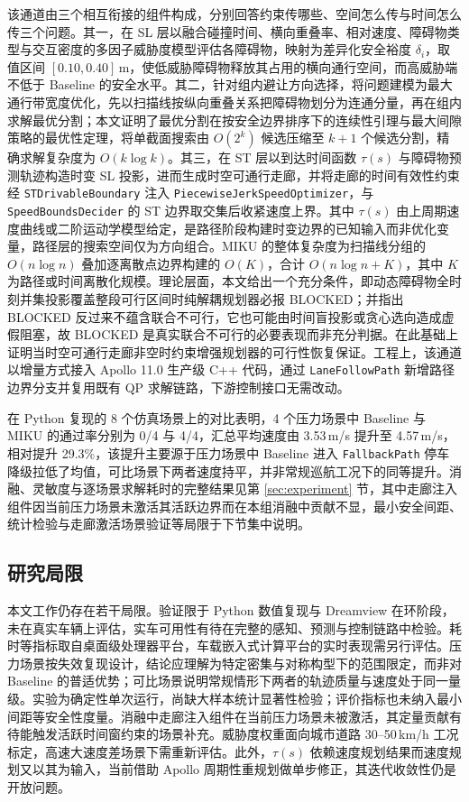 \documentclass[a4paper,11pt]{ctexart}
\theoremstyle{definition}
\begin{document}
该通道由三个相互衔接的组件构成，分别回答约束传哪些、空间怎么传与时间怎么传三个问题。其一，在 SL 层以融合碰撞时间、横向重叠率、相对速度、障碍物类型与交互密度的多因子威胁度模型评估各障碍物，映射为差异化安全裕度 $\delta_i$，取值区间 $[0.10, 0.40]$\,m，使低威胁障碍物释放其占用的横向通行空间，而高威胁端不低于 Baseline 的安全水平。其二，针对组内避让方向选择，将问题建模为最大通行带宽度优化，先以扫描线按纵向重叠关系把障碍物划分为连通分量，再在组内求解最优分割；本文证明了最优分割在按安全边界排序下的连续性引理与最大间隙策略的最优性定理，将单截面搜索由 $O(2^k)$ 候选压缩至 $k+1$ 个候选分割，精确求解复杂度为 $O(k\log k)$。其三，在 ST 层以到达时间函数 $\tau(s)$ 与障碍物预测轨迹构造时变 SL 投影，进而生成时空可通行走廊，并将走廊的时间有效性约束经 \texttt{STDrivableBoundary} 注入 \texttt{PiecewiseJerkSpeedOptimizer}，与 \texttt{SpeedBoundsDecider} 的 ST 边界取交集后收紧速度上界。其中 $\tau(s)$ 由上周期速度曲线或二阶运动学模型给定，是路径阶段构建时变边界的已知输入而非优化变量，路径层的搜索空间仅为方向组合。MIKU 的整体复杂度为扫描线分组的 $O(n\log n)$ 叠加逐离散点边界构建的 $O(K)$，合计 $O(n\log n + K)$，其中 $K$ 为路径或时间离散化规模。理论层面，本文给出一个充分条件，即动态障碍物全时刻并集投影覆盖整段可行区间时纯解耦规划器必报 BLOCKED；并指出 BLOCKED 反过来不蕴含联合不可行，它也可能由时间盲投影或贪心选向造成虚假阻塞，故 BLOCKED 是真实联合不可行的必要表现而非充分判据。在此基础上证明当时空可通行走廊非空时约束增强规划器的可行性恢复保证。工程上，该通道以增量方式接入 Apollo 11.0 生产级 C++ 代码，通过 \texttt{LaneFollowPath} 新增路径边界分支并复用既有 QP 求解链路，下游控制接口无需改动。

在 Python 复现的 8 个仿真场景上的对比表明，4 个压力场景中 Baseline 与 MIKU 的通过率分别为 0/4 与 4/4，汇总平均速度由 3.53\,m/s 提升至 4.57\,m/s，相对提升 29.3\%，该提升主要源于压力场景中 Baseline 进入 \texttt{FallbackPath} 停车降级拉低了均值，可比场景下两者速度持平，并非常规巡航工况下的同等提升。消融、灵敏度与逐场景求解耗时的完整结果见第 \ref{sec:experiment} 节，其中走廊注入组件因当前压力场景未激活其活跃边界而在本组消融中贡献不显，最小安全间距、统计检验与走廊激活场景验证等局限于下节集中说明。

\subsection{研究局限}

本文工作仍存在若干局限。验证限于 Python 数值复现与 Dreamview 在环阶段，未在真实车辆上评估，实车可用性有待在完整的感知、预测与控制链路中检验。耗时等指标取自桌面级处理器平台，车载嵌入式计算平台的实时表现需另行评估。压力场景按失效复现设计，结论应理解为特定密集与对称构型下的范围限定，而非对 Baseline 的普适优势；可比场景说明常规情形下两者的轨迹质量与速度处于同一量级。实验为确定性单次运行，尚缺大样本统计显著性检验；评价指标也未纳入最小间距等安全性度量。消融中走廊注入组件在当前压力场景未被激活，其定量贡献有待能触发活跃时间窗约束的场景补充。威胁度权重面向城市道路 30--50\,km/h 工况标定，高速大速度差场景下需重新评估。此外，$\tau(s)$ 依赖速度规划结果而速度规划又以其为输入，当前借助 Apollo 周期性重规划做单步修正，其迭代收敛性仍是开放问题。
\end{document}
